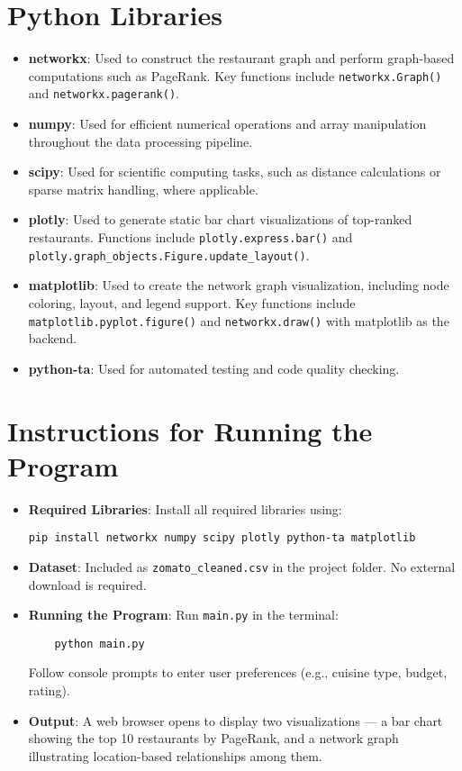 \documentclass[fontsize=11pt]{article}
\begin{document}
\section*{Python Libraries}
\begin{itemize}
    \item \textbf{networkx}: Used to construct the restaurant graph and perform graph-based computations such as PageRank. Key functions include \verb|networkx.Graph()| and \verb|networkx.pagerank()|.
    
    \item \textbf{numpy}: Used for efficient numerical operations and array manipulation throughout the data processing pipeline.
    
    \item \textbf{scipy}: Used for scientific computing tasks, such as distance calculations or sparse matrix handling, where applicable.
    
    \item \textbf{plotly}: Used to generate static bar chart visualizations of top-ranked restaurants. Functions include \verb|plotly.express.bar()| and \verb|plotly.graph_objects.Figure.update_layout()|.
    
    \item \textbf{matplotlib}: Used to create the network graph visualization, including node coloring, layout, and legend support. Key functions include \verb|matplotlib.pyplot.figure()| and \verb|networkx.draw()| with matplotlib as the backend.
    
    \item \textbf{python-ta}: Used for automated testing and code quality checking.
\end{itemize}


\section*{Instructions for Running the Program}
\begin{itemize}
    \item \textbf{Required Libraries}: Install all required libraries using:
\begin{verbatim}
pip install networkx numpy scipy plotly python-ta matplotlib
\end{verbatim}
    \item \textbf{Dataset}: Included as \texttt{zomato\_cleaned.csv} in the project folder. No external download is required.
    \item \textbf{Running the Program}: Run \texttt{main.py} in the terminal:
    \begin{verbatim}
    python main.py
    \end{verbatim}
    Follow console prompts to enter user preferences (e.g., cuisine type, budget, rating).
    \item \textbf{Output}: A web browser opens to display two visualizations — a bar chart showing the top 10 restaurants by PageRank, and a network graph illustrating location-based relationships among them.
\end{itemize}
\end{document}
